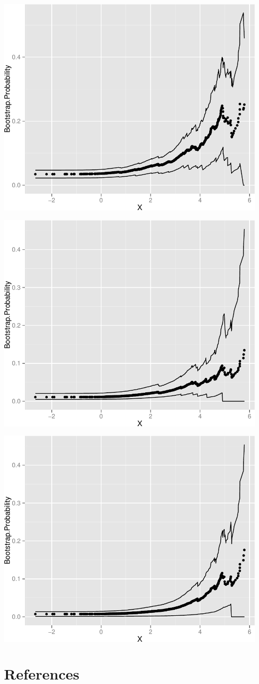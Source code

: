 \documentclass[11pt,]{article}
\begin{document}
\includegraphics{manuscript_files/figure-latex/who_rec_low2_cp-1.pdf}
\newpage

\includegraphics{manuscript_files/figure-latex/who_rec_med1_cp-1.pdf}
\newpage

\includegraphics{manuscript_files/figure-latex/who_rec_med2_cp-1.pdf}
\newpage

\section*{References}\label{references}
\end{document}
